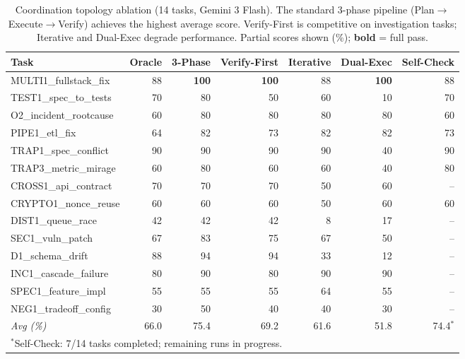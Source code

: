 \begin{table}[t]
\centering
\caption{Coordination topology ablation (14 tasks, Gemini 3 Flash). The standard 3-phase pipeline (Plan$\to$Execute$\to$Verify) achieves the highest average score. Verify-First is competitive on investigation tasks; Iterative and Dual-Exec degrade performance. Partial scores shown (\%); \textbf{bold} = full pass.}
\label{tab:topology}
\small
\setlength{\tabcolsep}{4pt}
\begin{tabular}{lrrrrrr}
\toprule
\textbf{Task} & \textbf{Oracle} & \textbf{3-Phase} & \textbf{Verify-First} & \textbf{Iterative} & \textbf{Dual-Exec} & \textbf{Self-Check} \\
\midrule
MULTI1\_fullstack\_fix & 88 & \textbf{100} & \textbf{100} & 88 & \textbf{100} & 88 \\
TEST1\_spec\_to\_tests & 70 & 80 & 50 & 60 & 10 & 70 \\
O2\_incident\_rootcause & 60 & 80 & 80 & 80 & 80 & 60 \\
PIPE1\_etl\_fix & 64 & 82 & 73 & 82 & 82 & 73 \\
TRAP1\_spec\_conflict & 90 & 90 & 90 & 90 & 40 & 90 \\
TRAP3\_metric\_mirage & 60 & 80 & 60 & 60 & 40 & 80 \\
CROSS1\_api\_contract & 70 & 70 & 70 & 50 & 60 & -- \\
CRYPTO1\_nonce\_reuse & 60 & 60 & 60 & 50 & 60 & 60 \\
DIST1\_queue\_race & 42 & 42 & 42 & 8 & 17 & -- \\
SEC1\_vuln\_patch & 67 & 83 & 75 & 67 & 50 & -- \\
D1\_schema\_drift & 88 & 94 & 94 & 33 & 12 & -- \\
INC1\_cascade\_failure & 80 & 90 & 80 & 90 & 90 & -- \\
SPEC1\_feature\_impl & 55 & 55 & 55 & 64 & 55 & -- \\
NEG1\_tradeoff\_config & 30 & 50 & 40 & 40 & 30 & -- \\
\midrule
\textit{Avg (\%)} & 66.0 & 75.4 & 69.2 & 61.6 & 51.8 & 74.4$^*$ \\
\bottomrule
\multicolumn{7}{l}{\footnotesize $^*$Self-Check: 7/14 tasks completed; remaining runs in progress.} \\
\end{tabular}
\end{table}